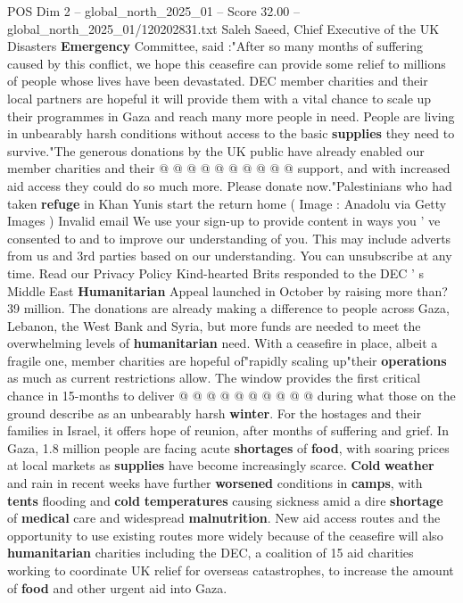 \begin{textsample}{POS Dim 2 – global\_north\_2025\_01 – Score 32.00 – global\_north\_2025\_01/120202831.txt}
Saleh Saeed, Chief Executive of the UK Disasters \textbf{Emergency} Committee, said :"After so many months of suffering caused by this conflict, we hope this ceasefire can provide some relief to millions of people whose lives have been devastated.
DEC member charities and their local partners are hopeful it will provide them with a vital chance to scale up their programmes in Gaza and reach many more people in need.
People are living in unbearably harsh conditions without access to the basic \textbf{supplies} they need to survive."The generous donations by the UK public have already enabled our member charities and their @ @ @ @ @ @ @ @ @ @ support, and with increased aid access they could do so much more.
Please donate now."Palestinians who had taken \textbf{refuge} in Khan Yunis start the return home ( Image : Anadolu via Getty Images ) Invalid email We use your sign-up to provide content in ways you ' ve consented to and to improve our understanding of you.
This may include adverts from us and 3rd parties based on our understanding.
You can unsubscribe at any time.
Read our Privacy Policy Kind-hearted Brits responded to the DEC ' s Middle East \textbf{Humanitarian} Appeal launched in October by raising more than? 39 million.
The donations are already making a difference to people across Gaza, Lebanon, the West Bank and Syria, but more funds are needed to meet the overwhelming levels of \textbf{humanitarian} need.
With a ceasefire in place, albeit a fragile one, member charities are hopeful of"rapidly scaling up"their \textbf{operations} as much as current restrictions allow.
The window provides the first critical chance in 15-months to deliver @ @ @ @ @ @ @ @ @ @ during what those on the ground describe as an unbearably harsh \textbf{winter}.
For the hostages and their families in Israel, it offers hope of reunion, after months of suffering and grief.
In Gaza, 1.8 million people are facing acute \textbf{shortages} of \textbf{food}, with soaring prices at local markets as \textbf{supplies} have become increasingly scarce. \textbf{Cold} \textbf{weather} and rain in recent weeks have further \textbf{worsened} conditions in \textbf{camps}, with \textbf{tents} flooding and \textbf{cold} \textbf{temperatures} causing sickness amid a dire \textbf{shortage} of \textbf{medical} care and widespread \textbf{malnutrition}.
New aid access routes and the opportunity to use existing routes more widely because of the ceasefire will also \textbf{humanitarian} charities including the DEC, a coalition of 15 aid charities working to coordinate UK relief for overseas catastrophes, to increase the amount of \textbf{food} and other urgent aid into Gaza.

\end{textsample}

